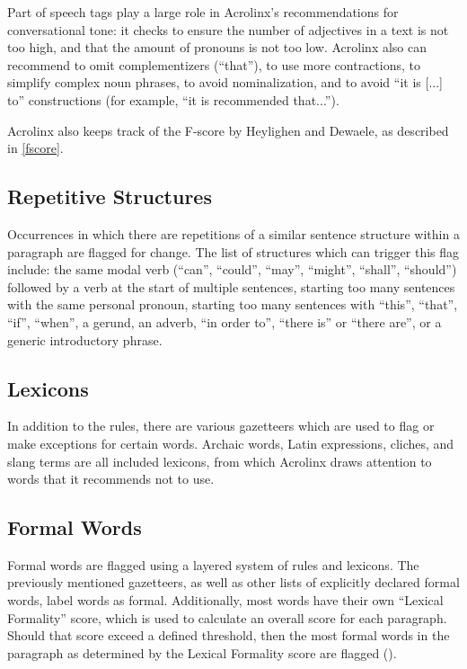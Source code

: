 Part of speech tags play a large role in Acrolinx's recommendations for conversational tone: it checks to ensure the number of adjectives in a text is not too high, and that the amount of pronouns is not too low. Acrolinx also can recommend to omit complementizers (``that''), to use more contractions, to simplify complex noun phrases, to avoid nominalization, and to avoid ``it is [...] to'' constructions (for example, ``it is recommended that...'').

Acrolinx also keeps track of the F-score by Heylighen and Dewaele, as described in \ref{fscore}.

\subsection{Repetitive Structures}

Occurrences in which there are repetitions of a similar sentence structure within a paragraph are flagged for change. The list of structures which can trigger this flag include: the same modal verb (``can'', ``could'', ``may'', ``might'', ``shall'', ``should'') followed by a verb at the start of multiple sentences, starting too many sentences with the same personal pronoun, starting too many sentences with ``this'', ``that'', ``if'', ``when'', a gerund, an adverb, ``in order to'', ``there is'' or ``there are'', or a generic introductory phrase.

\subsection{Lexicons}

In addition to the rules, there are various gazetteers which are used to flag or make exceptions for certain words. Archaic words, Latin expressions, cliches, and slang terms are all included lexicons, from which Acrolinx draws attention to words that it recommends not to use.

\subsection{Formal Words} \label{lf}

Formal words are flagged using a layered system of rules and lexicons. The previously mentioned gazetteers, as well as other lists of explicitly declared formal words, label words as formal. Additionally, most words have their own ``Lexical Formality'' score, which is used to calculate an overall score for each paragraph. Should that score exceed a defined threshold, then the most formal words in the paragraph as determined by the Lexical Formality score are flagged (\cite{acro20147lf}).

